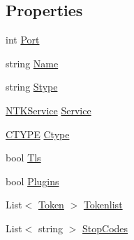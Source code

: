 \subsection*{Properties}
\begin{DoxyCompactItemize}
\item 
int \mbox{\hyperlink{class_n_t_k_1_1_n_t_k_server_a0c98a3dd7c9f238f5ebbb8300a97791a}{Port}}
\item 
string \mbox{\hyperlink{class_n_t_k_1_1_n_t_k_server_a19911075c54f7892305b453118be9d04}{Name}}
\item 
string \mbox{\hyperlink{class_n_t_k_1_1_n_t_k_server_ad2ace232f3d05447f74c1a078bc04042}{Stype}}
\item 
\mbox{\hyperlink{class_n_t_k_1_1_service_1_1_n_t_k_service}{N\+T\+K\+Service}} \mbox{\hyperlink{class_n_t_k_1_1_n_t_k_server_a4ea3c6041753673441953f1167c640b8}{Service}}
\item 
\mbox{\hyperlink{namespace_n_t_k_a8fa28c7c4270bbb81ee96b4f632fdbec}{C\+T\+Y\+PE}} \mbox{\hyperlink{class_n_t_k_1_1_n_t_k_server_aa40f4790ecbcdf3f944af7bc00075914}{Ctype}}
\item 
bool \mbox{\hyperlink{class_n_t_k_1_1_n_t_k_server_a0e7e43bbf11b31e6bdaebcae46071c86}{Tls}}
\item 
bool \mbox{\hyperlink{class_n_t_k_1_1_n_t_k_server_a3fc3ec7327660b891e316e401e44838a}{Plugins}}
\item 
List$<$ \mbox{\hyperlink{class_n_t_k_1_1_other_1_1_token}{Token}} $>$ \mbox{\hyperlink{class_n_t_k_1_1_n_t_k_server_adc563330fa6178c43c1f411b8c8ca536}{Tokenlist}}
\item 
List$<$ string $>$ \mbox{\hyperlink{class_n_t_k_1_1_n_t_k_server_acade77c57244684e307b41cbfc31a203}{Stop\+Codes}}
\item 

\end{DoxyCompactItemize}
